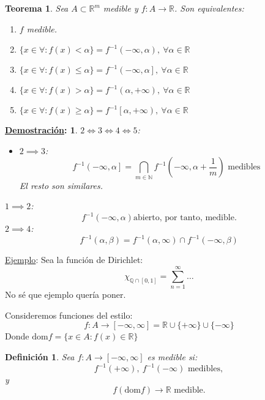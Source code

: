 \documentclass[10pt,a4paper,openright]{book}
\theoremstyle{break}
\newtheorem*{defi}{Definición}
\newtheorem*{theo}{Teorema}
\newtheorem*{demo}{\underline{Demostración}:}
\begin{document}
\begin{theo}
Sea $A \subset  \mathbb{R}^m$ medible y $f: A \to \mathbb{R}$. Son equivalentes:
\begin{enumerate}
    \item $f$ medible.
    \item $\{x \in \forall : f\left( x \right) < \alpha\} = f^{-1}\left( -\infty, \alpha \right),\ \forall \alpha \in \mathbb{R}$
    \item $\{x \in \forall : f\left( x \right) \le \alpha\} = f^{-1}\left( -\infty, \alpha \right],\ \forall \alpha \in \mathbb{R}$
    \item $\{x \in \forall : f\left( x \right) > \alpha\} = f^{-1}\left( \alpha, +\infty \right),\ \forall \alpha \in \mathbb{R}$
    \item $\{x \in \forall : f\left( x \right) \ge \alpha\} = f^{-1}\left[ \alpha, +\infty \right),\ \forall \alpha \in \mathbb{R}$
\end{enumerate}
\end{theo}
\begin{demo}
$2 \iff 3 \iff 4 \iff 5$: 
\begin{itemize}
    \item $2 \implies 3$:
    $$f^{-1}\left( -\infty, \alpha \right] = \bigcap_{m \in \mathbb{N}}f^{-1}\left( -\infty, \alpha + \frac{1}{m} \right) \text{ medibles}$$
    El resto son similares.
\end{itemize}
$1 \implies 2$:
$$f^{-1}\left( -\infty, \alpha \right) \text{abierto, por tanto, medible.}$$
$2 \implies 4$:
$$f^{-1}\left( \alpha, \beta \right) = f^{-1}\left( \alpha, \infty \right) \cap f^{-1}\left( -\infty, \beta \right)$$
\end{demo}

\underline{Ejemplo}:
Sea la función de Dirichlet:
$$\chi_{\mathbb{Q} \cap \left[0, 1\right]} = \sum_{n=1}^{\infty} \ldots$$
No sé que ejemplo quería poner.

Consideremos funciones del estilo:
$$f: A \to \left[-\infty, \infty\right] = \mathbb{R} \cup \{+\infty\} \cup \{-\infty\}$$
Donde $\mathrm{dom}f = \{x \in A: f\left(x\right) \in \mathbb{R}\}$

\begin{defi}
Sea $f: A \to \left[-\infty, \infty\right]$ es medible si:
$$f^{-1}\left(+\infty\right),\ f^{-1}\left(-\infty\right) \text{ medibles},$$
y
$$f\left(\mathrm{dom}f\right) \to \mathbb{R} \text{ medible}.$$
\end{defi}
\end{document}
